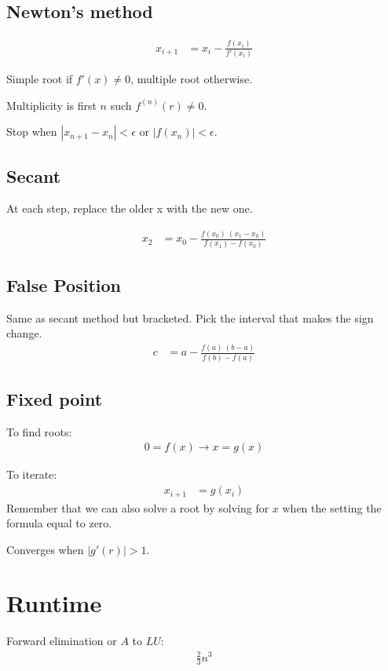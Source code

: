\documentclass[12pt]{article}
\newcommand{\straight}[1]{\left|       #1 \right|}
\begin{document}
\subsection*{Newton's method}
\begin{align*}
    x_{i + 1} &= x_i - \frac{f(x_i)}{f'(x_i)}
\end{align*}

Simple root if $f'(x) \neq 0$, multiple root otherwise.

Multiplicity is first $n$ such $f^{(n)}(r) \neq 0$.

Stop when $\straight{x_{n+1} - x_n} < \epsilon$ or $\straight{f(x_n)} < \epsilon$.

\subsection*{Secant}
At each step, replace the older x with the new one.

\begin{align*}
    x_2 &= x_0 - \frac{f(x_0)\ (x_1 - x_0)}{f(x_1) - f(x_0)}
\end{align*}

\subsection*{False Position}
Same as secant method but bracketed. Pick the interval that makes the sign change.
\begin{align*}
    c &= a - \frac{f(a)\ (b - a)}{f(b) - f(a)}
\end{align*}

\subsection*{Fixed point}
To find roots:
\begin{align*}
    0 = f(x) \rightarrow x = g(x)
\end{align*}

To iterate:
\begin{align*}
    x_{i+1} &= g(x_i)
\end{align*}
Remember that we can also solve a root by solving for $x$ when the setting the formula equal to zero.

Converges when $\straight{g'(r)} > 1$.

\section*{Runtime}
Forward elimination or $A$ to $LU$:
\begin{align*}
    \frac{2}{3}n^3
\end{align*}
\end{document}
